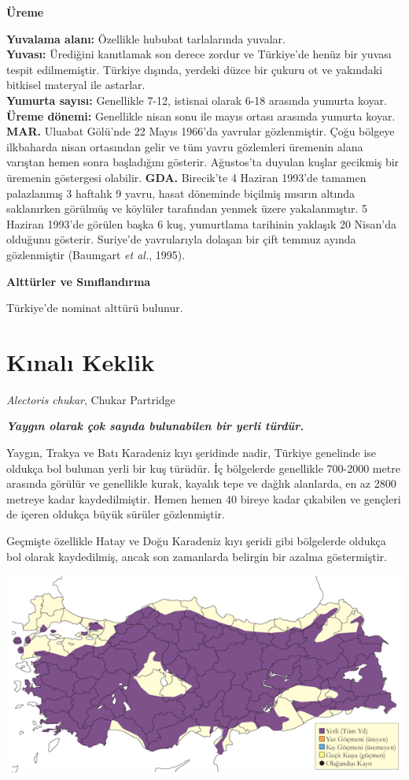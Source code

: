 \documentclass[
  a4paper,
  DIV=11,
  numbers=noendperiod]{scrreprt}
\begin{document}
\textbf{Üreme}

\textbf{Yuvalama alanı:} Özellikle hububat tarlalarında yuvalar.\\
\textbf{Yuvası:} Ürediğini kanıtlamak son derece zordur ve Türkiye'de
henüz bir yuvası tespit edilmemiştir. Türkiye dışında, yerdeki düzce bir
çukuru ot ve yakındaki bitkisel materyal ile astarlar.\\
\textbf{Yumurta sayısı:} Genellikle 7-12, istisnai olarak 6-18 arasında
yumurta koyar.\\
\textbf{Üreme dönemi:} Genellikle nisan sonu ile mayıs ortası arasında
yumurta koyar. \textbf{MAR.} Uluabat Gölü'nde 22 Mayıs 1966'da yavrular
gözlenmiştir. Çoğu bölgeye ilkbaharda nisan ortasından gelir ve tüm
yavru gözlemleri üremenin alana varıştan hemen sonra başladığını
gösterir. Ağustos'ta duyulan kuşlar gecikmiş bir üremenin göstergesi
olabilir. \textbf{GDA.} Birecik'te 4 Haziran 1993'de tamamen palazlanmış
3 haftalık 9 yavru, hasat döneminde biçilmiş mısırın altında saklanırken
görülmüş ve köylüler tarafından yenmek üzere yakalanmıştır. 5 Haziran
1993'de görülen başka 6 kuş, yumurtlama tarihinin yaklaşık 20 Nisan'da
olduğunu gösterir. Suriye'de yavrularıyla dolaşan bir çift temmuz ayında
gözlenmiştir (Baumgart \emph{et al.}, 1995).

\textbf{Alttürler ve Sınıflandırma}

Türkiye'de nominat alttürü bulunur.

\section{Kınalı Keklik}\label{kux131nalux131-keklik}

\emph{Alectoris chukar}, Chukar Partridge

\textbf{\emph{Yaygın olarak çok sayıda bulunabilen bir yerli türdür.}}

Yaygın, Trakya ve Batı Karadeniz kıyı şeridinde nadir, Türkiye genelinde
ise oldukça bol bulunan yerli bir kuş türüdür. İç bölgelerde genellikle
700-2000 metre arasında görülür ve genellikle kurak, kayalık tepe ve
dağlık alanlarda, en az 2800 metreye kadar kaydedilmiştir. Hemen hemen
40 bireye kadar çıkabilen ve gençleri de içeren oldukça büyük sürüler
gözlenmiştir.

Geçmişte özellikle Hatay ve Doğu Karadeniz kıyı şeridi gibi bölgelerde
oldukça bol olarak kaydedilmiş, ancak son zamanlarda belirgin bir azalma
göstermiştir.

\includegraphics{images/harita_Page_039.png}
\end{document}
